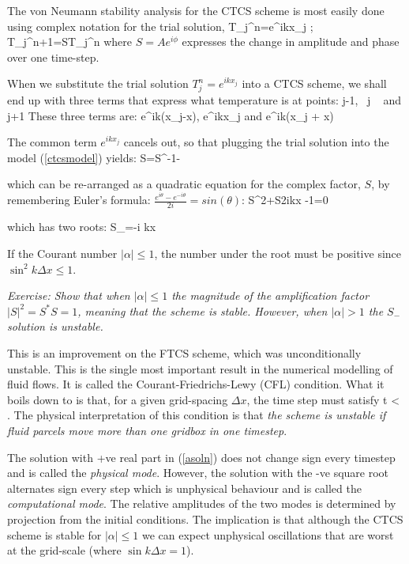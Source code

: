 The von Neumann stability analysis for the CTCS scheme is most easily
done using complex notation for the trial solution, 
\BEQ T_j^n=e^{ikx_j}\;\; ; \;\;\;\; T_j^{n+1}=ST_j^n \EEQ
where $S=Ae^{i\phi}$ expresses 
the change in amplitude and phase over one time-step.



When we substitute the trial solution $T_j^n=e^{ikx_j}$ into a CTCS scheme, we shall end up with three terms that express what temperature is at points: \BEQ j-1, \;\;\;\ j \;\;\;\ \textrm{   and  } \;\; j+1 \EEQ
These three terms are: \BEQ e^{ik(x_j-\Delta x)},  \;\;\;\;\; e^{ikx_j} \;\;\;\;\; \textrm{   and   } \;\; e^{ik(x_j + \Delta x)}\EEQ

The common term $e^{ikx_j}$ cancels out, so that plugging the trial solution into the model (\ref{ctcsmodel}) yields:
\BEQ
S=S^{-1}-\alpha{}
\EEQ

which can be re-arranged as a quadratic equation
for the complex factor, $S$, by remembering Euler's formula: $\frac {e^{i\theta} - e^{-i \theta}}{2i}= sin(\theta)$:
\BEQ
S^2+S\alpha 2i\sin k\Delta x -1=0
\EEQ

which has two roots:
\BEQ
S_{\pm}=-i \alpha \sin k\Delta x\pm {}
\label{asoln}
\EEQ

If the Courant number $|\alpha | \le 1$, the number under the root must
be positive since $\sin^2 k\Delta x \le 1$. 

{\em Exercise: Show that when $|\alpha | \le 1$ the magnitude of the
	amplification factor $|S|^2=S^* S=1$, meaning that the scheme is
	stable. However, when $|\alpha | > 1$ the $S_{-}$ solution is
	unstable.}

This is an improvement on the FTCS scheme, which was unconditionally
unstable. This is the single most important result in the numerical
modelling of fluid flows.  It is called the Courant-Friedrichs-Lewy
(CFL) condition.  What it boils down to is that, for a given
grid-spacing $\Delta x$, the time step must satisfy \BEQ \Delta t <
 . \EEQ The physical interpretation of this condition
is that \emph{the scheme is unstable if fluid parcels move more than
	one gridbox in one timestep}.

The solution with +ve real part in (\ref{asoln}) does not change sign
every timestep and is called the {\em physical mode}. However, the
solution with the -ve square root alternates sign every step which is
unphysical behaviour and is called the {\em computational mode}. The
relative amplitudes of the two modes is determined by projection from
the initial conditions. The implication is that although the CTCS
scheme is stable for $|\alpha | \le 1$ we can expect unphysical
oscillations that are worst at the grid-scale (where $\sin k\Delta
x=1$).

